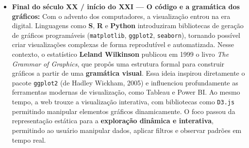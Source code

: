 \begin{itemize}[leftmargin=*]
  \item \textbf{Final do século XX / início do XXI — O código e a gramática dos gráficos:}  
  Com o advento dos computadores, a visualização entrou na era digital. Linguagens como \textbf{S}, \textbf{R} e \textbf{Python} introduziram bibliotecas de geração de gráficos programáveis (\texttt{matplotlib}, \texttt{ggplot2}, \texttt{seaborn}), tornando possível criar visualizações complexas de forma reprodutível e automatizada.  
  Nesse contexto, o estatístico \textbf{Leland Wilkinson} publicou em 1999 o livro \textit{The Grammar of Graphics}, que propôs uma estrutura formal para construir gráficos a partir de uma \textbf{gramática visual}. Essa ideia inspirou diretamente o pacote \texttt{ggplot2} (de Hadley Wickham, 2005) e influenciou profundamente as ferramentas modernas de visualização, como Tableau e Power BI.  
  Ao mesmo tempo, a web trouxe a visualização interativa, com bibliotecas como \texttt{D3.js} permitindo manipular elementos gráficos dinamicamente.  
  O foco passou da representação estática para a \textbf{exploração dinâmica e interativa}, permitindo ao usuário manipular dados, aplicar filtros e observar padrões em tempo real.


\end{itemize}
